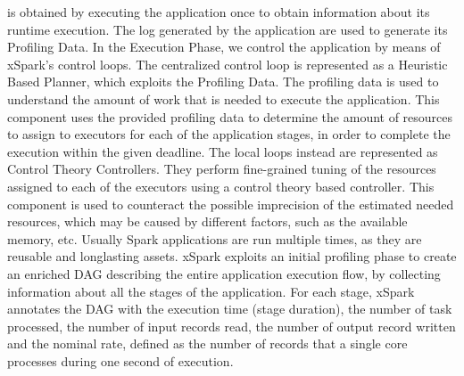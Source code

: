 is obtained by executing the application once to obtain information
about its runtime execution. The log generated by the application are used to generate its Profiling Data.
In the Execution Phase, we control the application by means of xSpark’s control loops. 
The centralized control loop is represented as a Heuristic Based Planner, which exploits the Profiling Data. The profiling data is used to understand the amount of
work that is needed to execute the application. This component uses the provided profiling data to determine the amount of resources to assign to executors for each of the application stages, in order to complete the execution within the given deadline. The
local loops instead are represented as Control Theory Controllers. They
perform fine-grained tuning of the resources assigned to each of the
executors using a control theory based controller. This component is
used to counteract the possible imprecision of the estimated needed
resources, which may be caused by different factors, such as the available
memory, etc.
Usually Spark applications are run multiple times, as they are reusable and longlasting assets. xSpark exploits an initial profiling phase to create an enriched DAG describing the entire application execution flow, by collecting information about all the stages of the application. For each stage, xSpark annotates the DAG with the execution time (stage duration), the number of task processed, the number of input records read, the number of
output record written and the nominal rate, defined as the number of
records that a single core processes during one second of execution. 

%

